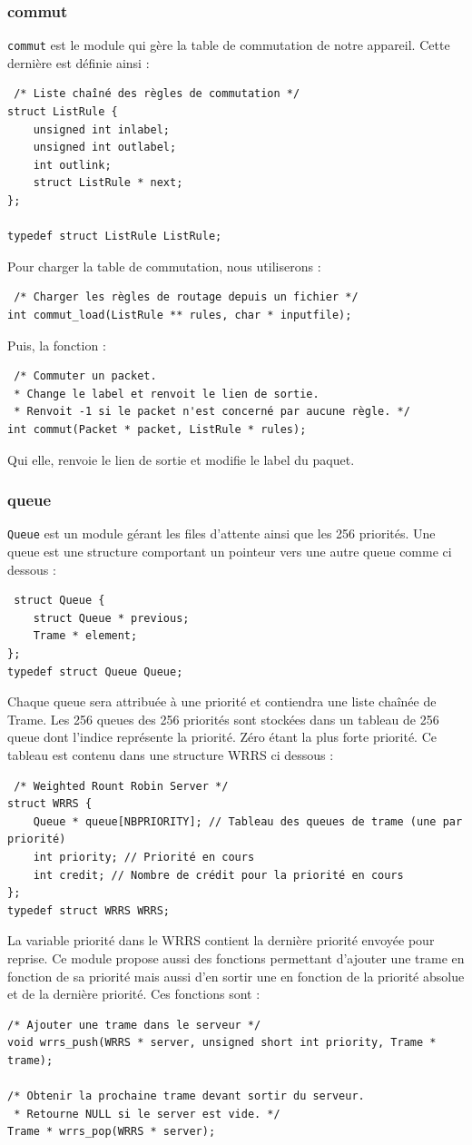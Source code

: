\documentclass[a4paper,11pt]{article}
\begin{document}
\subsubsection{commut}
\texttt{commut} est le module qui gère la table de commutation de notre appareil. Cette dernière est définie ainsi :
\begin{verbatim}
 /* Liste chaîné des règles de commutation */
struct ListRule {
    unsigned int inlabel;
    unsigned int outlabel;
    int outlink;
    struct ListRule * next;
};

typedef struct ListRule ListRule;
\end{verbatim}
Pour charger la table de commutation, nous utiliserons :
\begin{verbatim}
 /* Charger les règles de routage depuis un fichier */
int commut_load(ListRule ** rules, char * inputfile);
\end{verbatim}
Puis, la fonction :
\begin{verbatim}
 /* Commuter un packet.
 * Change le label et renvoit le lien de sortie.
 * Renvoit -1 si le packet n'est concerné par aucune règle. */
int commut(Packet * packet, ListRule * rules);
\end{verbatim}
Qui elle, renvoie le lien de sortie et modifie le label du paquet.
\subsubsection{queue}
\texttt{Queue} est un module gérant les files d'attente ainsi que les 256 priorités. Une queue est une structure comportant un pointeur vers une autre queue comme ci dessous :
\begin{verbatim}
 struct Queue {
    struct Queue * previous;
    Trame * element;
};
typedef struct Queue Queue;
\end{verbatim}
Chaque queue sera attribuée à une priorité et contiendra une liste chaînée de Trame. Les 256 queues des 256 priorités sont stockées dans un tableau de 256 queue dont l'indice représente la priorité. Zéro étant la plus forte priorité. Ce tableau est contenu dans une structure WRRS ci dessous :
\begin{verbatim}
 /* Weighted Rount Robin Server */
struct WRRS {
    Queue * queue[NBPRIORITY]; // Tableau des queues de trame (une par priorité)
    int priority; // Priorité en cours
    int credit; // Nombre de crédit pour la priorité en cours
};
typedef struct WRRS WRRS;
\end{verbatim}
La variable priorité dans le WRRS contient la dernière priorité envoyée pour reprise. Ce module propose aussi des fonctions permettant d'ajouter une trame en fonction de sa priorité mais aussi d'en sortir une en fonction de la priorité absolue et de la dernière priorité. Ces fonctions sont :
\begin{verbatim}
/* Ajouter une trame dans le serveur */
void wrrs_push(WRRS * server, unsigned short int priority, Trame * trame);

/* Obtenir la prochaine trame devant sortir du serveur.
 * Retourne NULL si le server est vide. */
Trame * wrrs_pop(WRRS * server);
\end{verbatim}
\end{document}
